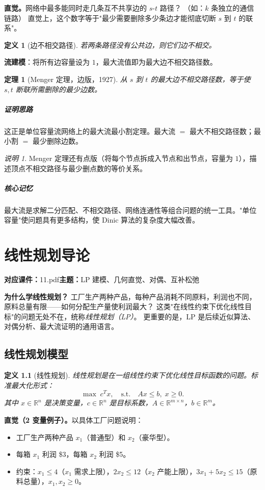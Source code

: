 \documentclass[UTF8,openany,12pt]{ctexbook}
\newtheorem{definition}{定义}[chapter]
\newtheorem{theorem}{定理}[chapter]
\theoremstyle{remark}
\newtheorem{remark}{说明}[chapter]
\newcommand{\lecture}[3]{
  \chapter{#2}
  \noindent\textbf{对应课件：}#1\hfill\textbf{主题：}#3
  \vspace{0.6em}
}
\newcommand{\keypoint}[1]{\paragraph{核心记忆}#1}
\newcommand{\proofidea}[1]{\paragraph{证明思路}#1}
\begin{document}
\noindent\textbf{直觉。}网络中最多能同时走几条互不共享边的 $s$-$t$ 路径？
（如：$k$ 条独立的通信链路）
直觉上，这个数字等于"最少需要删除多少条边才能彻底切断 $s$ 到 $t$ 的联系"。

\begin{definition}[边不相交路径]
若两条路径没有公共边，则它们\emph{边不相交}。
\end{definition}

\noindent\textbf{流建模}：将所有边容量设为 $1$，最大流值即为最大边不相交路径数。

\begin{theorem}[Menger 定理，边版，1927]
从 $s$ 到 $t$ 的最大边不相交路径数，等于使 $s,t$ 断联所需删除的最少边数。
\end{theorem}
\proofidea{这正是单位容量流网络上的最大流最小割定理。最大流 $=$ 最大不相交路径数；最小割 $=$ 最少删除边数。}

\begin{remark}
Menger 定理还有点版（将每个节点拆成入节点和出节点，容量为 $1$），描述顶点不相交路径与最少删点数的等价关系。
\end{remark}

\keypoint{最大流是求解二分匹配、不相交路径、网络连通性等组合问题的统一工具。"单位容量"使问题具有更多结构，使 Dinic 算法的复杂度大幅改善。}


\lecture{11.pdf}{线性规划导论}{LP 建模、几何直觉、对偶、互补松弛}

\noindent
\textbf{为什么学线性规划？}
工厂生产两种产品，每种产品消耗不同原料，利润也不同，原料总量有限——如何分配生产量使利润最大？
这类"在线性约束下优化线性目标"的问题无处不在，统称\emph{线性规划（LP）}。
更重要的是，LP 是后续近似算法、对偶分析、最大流证明的通用语言。

\section{线性规划模型}

\begin{definition}[线性规划]
线性规划是在一组线性约束下优化线性目标函数的问题。标准最大化形式：
\[
  \max\; c^Tx,\quad \text{s.t.}\quad Ax\le b,\; x\ge 0.
\]
其中 $x\in\mathbb{R}^n$ 是决策变量，$c\in\mathbb{R}^n$ 是目标系数，$A\in\mathbb{R}^{m\times n}$，$b\in\mathbb{R}^m$。
\end{definition}

\noindent\textbf{直觉（2 变量例子）。}以具体工厂问题说明：
\begin{itemize}
  \item 工厂生产两种产品 $x_1$（普通型）和 $x_2$（豪华型）。
  \item 每箱 $x_1$ 利润 \$3，每箱 $x_2$ 利润 \$5。
  \item 约束：$x_1\le 4$（$x_1$ 需求上限），$2x_2\le 12$（$x_2$ 产能上限），$3x_1+5x_2\le 15$（原料总量），$x_1,x_2\ge 0$。
\end{itemize}
\end{document}
